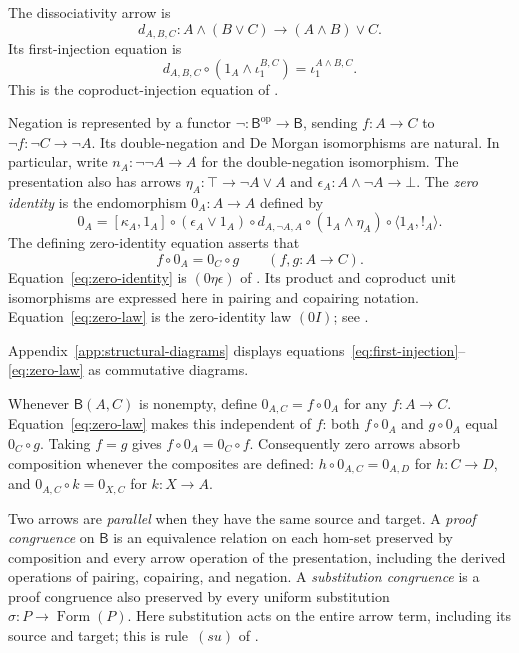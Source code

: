\documentclass[11pt]{article}
\newcommand{\B}{\mathsf B}
\newcommand{\FormulaSet}{\operatorname{Form}}
\begin{document}
The dissociativity arrow is
\[
 d_{A,B,C}:A\wedge(B\vee C)\longrightarrow(A\wedge B)\vee C.
\]
Its first-injection equation is
\begin{equation}
 d_{A,B,C}\circ(1_A\wedge\iota_1^{B,C})
   =\iota_1^{A\wedge B,C}.
 \label{eq:first-injection}
\end{equation}
This is the coproduct-injection equation of
\cite[\S11.1, p.~234]{DP}.

Negation is represented by a functor
$\neg:\B^{\mathrm{op}}\to\B$, sending $f:A\to C$ to
$\neg f:\neg C\to\neg A$. Its double-negation and De Morgan
isomorphisms are natural. In particular, write
$n_A:\neg\neg A\to A$ for the double-negation isomorphism.
The presentation also has arrows
$\eta_A:\top\to\neg A\vee A$ and
$\epsilon_A:A\wedge\neg A\to\bot$.
The \emph{zero identity} is the endomorphism $0_A:A\to A$ defined by
\begin{equation}
 0_A=[\kappa_A,1_A]\circ(\epsilon_A\vee1_A)\circ d_{A,\neg A,A}
     \circ(1_A\wedge\eta_A)\circ\langle1_A,!_A\rangle.
 \label{eq:zero-identity}
\end{equation}
The defining zero-identity equation asserts that
\begin{equation}
 f\circ0_A=0_C\circ g
 \qquad(f,g:A\to C).
 \label{eq:zero-law}
\end{equation}
Equation~\eqref{eq:zero-identity} is $(0\eta\epsilon)$ of
\cite[\S14.2, p.~317]{DP}. Its product and coproduct unit isomorphisms
are expressed here in pairing and copairing notation.
Equation~\eqref{eq:zero-law} is the zero-identity law $(0I)$;
see \cite[\S14.3, p.~322]{DP}.

Appendix~\ref{app:structural-diagrams} displays
equations~\eqref{eq:first-injection}--\eqref{eq:zero-law}
as commutative diagrams.

Whenever $\B(A,C)$ is nonempty, define $0_{A,C}=f\circ0_A$ for any
$f:A\to C$. Equation~\eqref{eq:zero-law} makes this independent of
$f$: both $f\circ0_A$ and $g\circ0_A$ equal $0_C\circ g$.
Taking $f=g$ gives $f\circ0_A=0_C\circ f$. Consequently zero arrows
absorb composition whenever the composites are defined:
$h\circ0_{A,C}=0_{A,D}$ for $h:C\to D$, and
$0_{A,C}\circ k=0_{X,C}$ for $k:X\to A$.

Two arrows are \emph{parallel} when they have the same source and
target. A \emph{proof congruence} on $\B$ is an equivalence relation
on each hom-set preserved by composition and every arrow operation
of the presentation, including the derived operations of pairing,
copairing, and negation.
A \emph{substitution congruence} is a proof congruence also preserved
by every uniform substitution $\sigma:P\to\FormulaSet(P)$.
Here substitution acts on the entire arrow term, including its source
and target; this is rule~$(su)$ of \cite[\S2.7, p.~51]{DP}.
\end{document}
